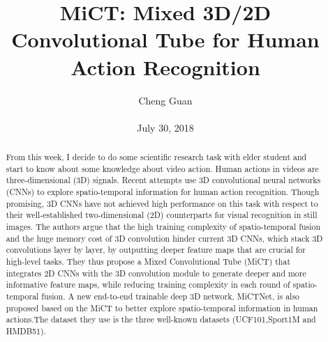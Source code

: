 \documentclass[10pt,twocolumn,letterpaper]{article}
\title{MiCT: Mixed 3D/2D Convolutional Tube for Human Action Recognition}
\author{Cheng Guan\\\\
July 30, 2018}
\begin{document}
\maketitle
\begin{abstract}
  From this week, I decide to do some scientific research task with elder student and start to know about some knowledge about video action. Human actions in videos are three-dimensional (3D) signals. Recent attempts use 3D convolutional neural networks
  (CNNs) to explore spatio-temporal information for human
  action recognition. Though promising, 3D CNNs have not
  achieved high performance on  this task with respect to
  their well-established two-dimensional (2D) counterparts
  for visual recognition in still images. The authors argue that the high
  training complexity of spatio-temporal fusion and the huge
  memory cost of 3D convolution hinder current 3D CNNs,
  which stack 3D convolutions layer by layer, by outputting
  deeper feature maps that are crucial for high-level tasks. They
  thus propose a Mixed Convolutional Tube (MiCT) that integrates 2D CNNs with the 3D convolution module to generate deeper and more informative feature maps, while reducing training complexity in each round of spatio-temporal fusion. A new end-to-end trainable deep 3D network, MiCTNet, is also proposed based on the MiCT to better explore
  spatio-temporal information in human actions.The dataset they use is the three well-known datasets (UCF101,Sport1M and HMDB51).
\end{abstract}
\end{document}
